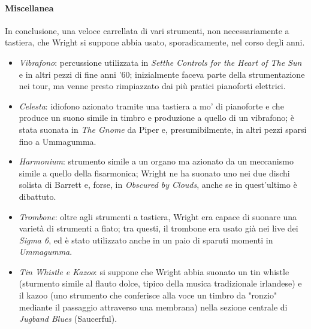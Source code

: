 \documentclass[class=book, crop=false, oneside, 12pt]{standalone}
\begin{document}
    \paragraph{Miscellanea} In conclusione, una veloce carrellata di vari strumenti, non necessariamente a tastiera, che Wright si suppone abbia usato, sporadicamente, nel corso degli anni.

    \begin{itemize}
        \item \emph{Vibrafono}: percussione utilizzata in \emph{Setthe Controls for the Heart of The Sun} e in altri pezzi di fine anni '60; inizialmente faceva parte della strumentazione nei tour, ma venne presto rimpiazzato dai più pratici pianoforti elettrici.
        \item \emph{Celesta}: idiofono azionato tramite una tastiera a mo' di pianoforte e che produce un suono simile in timbro e produzione a quello di un vibrafono; è stata suonata in \emph{The Gnome} da Piper e, presumibilmente, in altri pezzi sparsi fino a Ummagumma.
        \item \emph{Harmonium}: strumento simile a un organo ma azionato da un meccanismo simile a quello della fisarmonica; Wright ne ha suonato uno nei due dischi solista di Barrett e, forse, in \emph{Obscured by Clouds}, anche se in quest'ultimo è dibattuto.
        \item \emph{Trombone}: oltre agli strumenti a tastiera, Wright era capace di suonare una varietà di strumenti a fiato; tra questi, il trombone era usato già nei live dei \emph{Sigma 6}, ed è stato utilizzato anche in un paio di sparuti momenti in \emph{Ummagumma}.
        \item \emph{Tin Whistle e Kazoo}: si suppone che Wright abbia suonato un tin whistle (sturmento simile al flauto dolce, tipico della musica tradizionale irlandese) e il kazoo (uno strumento che conferisce alla voce un timbro da "ronzio" mediante il passaggio attraverso una membrana) nella sezione centrale di \emph{Jugband Blues} (Saucerful).
    \end{itemize}
\end{document}
